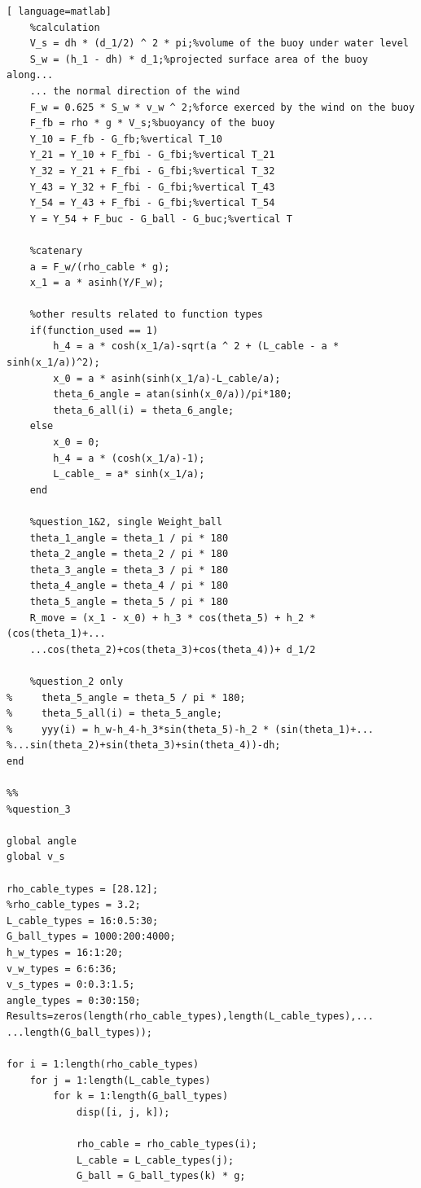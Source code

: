 \documentclass[a4paper,12pt]{ctexart}
\begin{document}
\begin{footnotesize}
\begin{lstlisting}[ language=matlab]
    %calculation
    V_s = dh * (d_1/2) ^ 2 * pi;%volume of the buoy under water level
    S_w = (h_1 - dh) * d_1;%projected surface area of the buoy along...
    ... the normal direction of the wind
    F_w = 0.625 * S_w * v_w ^ 2;%force exerced by the wind on the buoy
    F_fb = rho * g * V_s;%buoyancy of the buoy
    Y_10 = F_fb - G_fb;%vertical T_10
    Y_21 = Y_10 + F_fbi - G_fbi;%vertical T_21
    Y_32 = Y_21 + F_fbi - G_fbi;%vertical T_32
    Y_43 = Y_32 + F_fbi - G_fbi;%vertical T_43
    Y_54 = Y_43 + F_fbi - G_fbi;%vertical T_54
    Y = Y_54 + F_buc - G_ball - G_buc;%vertical T

    %catenary
    a = F_w/(rho_cable * g);
    x_1 = a * asinh(Y/F_w);

    %other results related to function types
    if(function_used == 1)
        h_4 = a * cosh(x_1/a)-sqrt(a ^ 2 + (L_cable - a * sinh(x_1/a))^2);
        x_0 = a * asinh(sinh(x_1/a)-L_cable/a);
        theta_6_angle = atan(sinh(x_0/a))/pi*180;
        theta_6_all(i) = theta_6_angle;
    else
        x_0 = 0;
        h_4 = a * (cosh(x_1/a)-1);
        L_cable_ = a* sinh(x_1/a);
    end

    %question_1&2, single Weight_ball
    theta_1_angle = theta_1 / pi * 180
    theta_2_angle = theta_2 / pi * 180
    theta_3_angle = theta_3 / pi * 180
    theta_4_angle = theta_4 / pi * 180
    theta_5_angle = theta_5 / pi * 180
    R_move = (x_1 - x_0) + h_3 * cos(theta_5) + h_2 * (cos(theta_1)+...
    ...cos(theta_2)+cos(theta_3)+cos(theta_4))+ d_1/2

    %question_2 only
%     theta_5_angle = theta_5 / pi * 180;
%     theta_5_all(i) = theta_5_angle;
%     yyy(i) = h_w-h_4-h_3*sin(theta_5)-h_2 * (sin(theta_1)+...
%...sin(theta_2)+sin(theta_3)+sin(theta_4))-dh;
end

%%
%question_3

global angle
global v_s

rho_cable_types = [28.12];
%rho_cable_types = 3.2;
L_cable_types = 16:0.5:30;
G_ball_types = 1000:200:4000;
h_w_types = 16:1:20;
v_w_types = 6:6:36;
v_s_types = 0:0.3:1.5;
angle_types = 0:30:150;
Results=zeros(length(rho_cable_types),length(L_cable_types),...
...length(G_ball_types));

for i = 1:length(rho_cable_types)
    for j = 1:length(L_cable_types)
        for k = 1:length(G_ball_types)
            disp([i, j, k]);

            rho_cable = rho_cable_types(i);
            L_cable = L_cable_types(j);
            G_ball = G_ball_types(k) * g;


\end{lstlisting}
\end{footnotesize}
\end{document}
